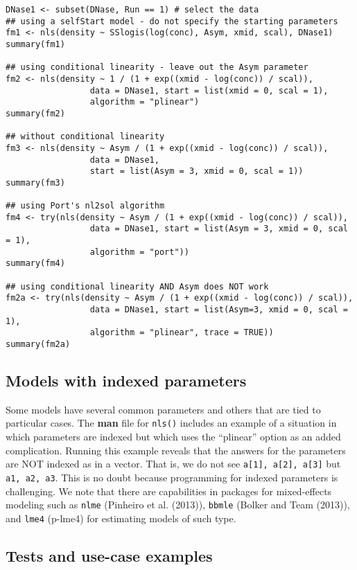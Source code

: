 \begin{verbatim}
DNase1 <- subset(DNase, Run == 1) # select the data
## using a selfStart model - do not specify the starting parameters
fm1 <- nls(density ~ SSlogis(log(conc), Asym, xmid, scal), DNase1)
summary(fm1)

## using conditional linearity - leave out the Asym parameter
fm2 <- nls(density ~ 1 / (1 + exp((xmid - log(conc)) / scal)),
                 data = DNase1, start = list(xmid = 0, scal = 1),
                 algorithm = "plinear")
summary(fm2)

## without conditional linearity
fm3 <- nls(density ~ Asym / (1 + exp((xmid - log(conc)) / scal)),
                 data = DNase1,
                 start = list(Asym = 3, xmid = 0, scal = 1))
summary(fm3)

## using Port's nl2sol algorithm
fm4 <- try(nls(density ~ Asym / (1 + exp((xmid - log(conc)) / scal)),
                 data = DNase1, start = list(Asym = 3, xmid = 0, scal = 1),
                 algorithm = "port"))
summary(fm4)

## using conditional linearity AND Asym does NOT work
fm2a <- try(nls(density ~ Asym / (1 + exp((xmid - log(conc)) / scal)), 
                 data = DNase1, start = list(Asym=3, xmid = 0, scal = 1),
                 algorithm = "plinear", trace = TRUE))
summary(fm2a)
\end{verbatim}

\hypertarget{models-with-indexed-parameters}{%
\subsection{Models with indexed parameters}\label{models-with-indexed-parameters}}

Some models have several common parameters and
others that are tied to particular cases.
The \textbf{man} file for \texttt{nls()} includes an example of a situation in which
parameters are indexed but which uses the ``plinear'' option as an added complication.
Running this example reveals that the answers for the parameters are NOT indexed
as in a vector.
That is, we do not see \texttt{a{[}1{]},\ a{[}2{]},\ a{[}3{]}} but \texttt{a1,\ a2,\ a3}.
This is no doubt because programming for indexed parameters is challenging.
We note that there are capabilities in packages for mixed-effects modeling
such as \texttt{nlme} (Pinheiro et al. (2013)), \texttt{bbmle} (Bolker and Team (2013)), and \texttt{lme4} (p-lme4) for
estimating models of such type.

\hypertarget{tests-and-use-case-examples}{%
\subsection{Tests and use-case examples}\label{tests-and-use-case-examples}}

